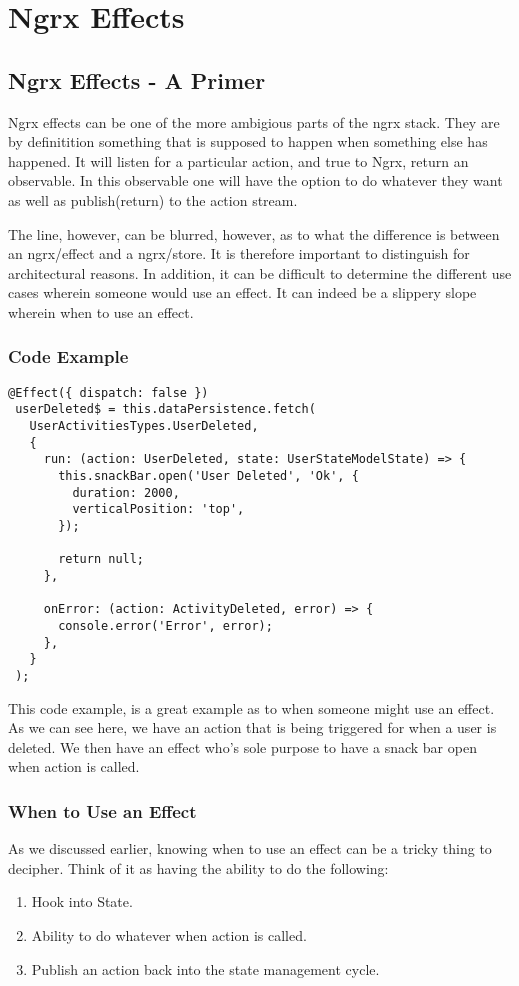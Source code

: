 \maketitle{}
\section{ Ngrx Effects }

\subsection{Ngrx Effects - A Primer}
Ngrx effects can be one of the more ambigious parts of the ngrx stack. They are
by definitition something that is supposed to happen when something else has
happened. It will listen for a particular action, and true to Ngrx, return an
observable. In this observable one will have the option to do whatever they want
as well as publish(return) to the action stream.

The line, however, can be blurred, however, as to what the difference is between
an ngrx/effect and a ngrx/store. It is therefore important to distinguish for
architectural reasons. In addition, it can be difficult to determine the
different use cases wherein someone would use an effect. It can indeed be a
slippery slope wherein when to use an effect.

\subsubsection{ Code Example }
\begin{lstlisting}
@Effect({ dispatch: false })
 userDeleted$ = this.dataPersistence.fetch(
   UserActivitiesTypes.UserDeleted,
   {
     run: (action: UserDeleted, state: UserStateModelState) => {
       this.snackBar.open('User Deleted', 'Ok', {
         duration: 2000,
         verticalPosition: 'top',
       });

       return null;
     },

     onError: (action: ActivityDeleted, error) => {
       console.error('Error', error);
     },
   }
 );
\end{lstlisting}

This code example, is a great example as to when someone might use an effect.
As we can see here, we have an action that is being triggered for when a user is
deleted. We then have an effect who's sole purpose to have a snack bar open
when action is called.

\subsubsection{ When to Use an Effect }
As we discussed earlier, knowing when to use an effect can be a tricky thing to
decipher. Think of it as having the ability to do the following:
\begin{enumerate}
  \item Hook into State.
  \item Ability to do whatever when action is called.
  \item Publish an action back into the state management cycle.
\end{enumerate}

